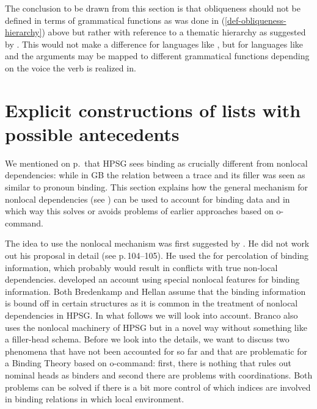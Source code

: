\documentclass[output=paper
 	        ,biblatex
                ,babelshorthands
                ,newtxmath
                ,draftmode
                ,colorlinks, citecolor=brown
]{langscibook}
\begin{document}
The conclusion to be drawn from this section is that obliqueness should not be defined in terms of
grammatical functions as was done in (\ref{def-obliqueness-hierarchy}) above but rather with
reference to a thematic hierarchy as suggested by \citet{Jackendoff72a-u}.
This would not make a difference for languages like , but for languages like
 and  the arguments may be mapped to different grammatical functions
depending on the voice the verb is realized in. 





\section{Explicit constructions of lists with possible antecedents}
\label{sec-bt-nonlocal}

We mentioned on p.\,\pageref{page-traces-binding} that HPSG sees binding as crucially different from nonlocal
dependencies: while in GB the relation between a trace and its filler was seen as similar to pronoun
binding. This section explains how the general mechanism for nonlocal dependencies (see
) can be used to account for binding data and in which way this solves or
avoids problems of earlier approaches based on o-command. 

The idea to use the nonlocal mechanism was first suggested by
\citet[Section~7.2.3]{Bredenkamp96a}. He did not work out his proposal in detail (see 
p.\,104--105). He used the \slashf for percolation of binding information, which probably would
result in conflicts with true non-local dependencies. \citet{Hellan2005a} developed an account using
special nonlocal features for binding information. Both Bredenkamp and Hellan assume that the
binding information is bound off in certain structures as it is common in the treatment of nonlocal
dependencies in HPSG. In what follows we will look into  account. Branco also
uses the nonlocal machinery of HPSG but in a novel way without something like a filler-head
schema. Before we look into the details, we want to discuss two phenomena that have not been
accounted for so far and that are problematic for a Binding Theory based on o-command: first, there
is nothing that rules out nominal heads as binders and second there are problems with
coordinations. Both problems can be solved if there is a bit more control of which indices are
involved in binding relations in which local environment.
\end{document}

